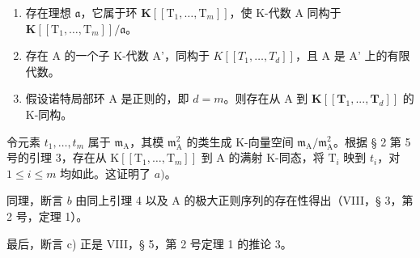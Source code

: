 \begin{enumerate}
\def\labelenumi{\alph{enumi})}
\item
  存在理想 \(\mathfrak{a}\)，它属于环 \(\mathbf{K}[[\mathrm{T}_1,\dots,\mathrm{T}_m]]\)，使 K-代数 A 同构于 \(\mathbf{K}[[\mathrm{T}_1,\dots,\mathrm{T}_m]] / \mathfrak{a}\)。
\item
  存在 A 的一个子 K-代数 A'，同构于 \(K[[T_{1}, \ldots, T_{d}]]\)，且 A 是 A' 上的有限代数。
\item
  假设诺特局部环 A 是正则的，即 \(d = m\)。则存在从 A 到 \(\mathbf{K}[[\mathbf{T}_1, ..., \mathbf{T}_d]]\) 的 K-同构。
\end{enumerate}

令元素 \(t_{1},\ldots,t_{m}\) 属于 \(\mathfrak{m}_{\mathrm{A}}\)，其模 \(\mathfrak{m}_{\mathrm{A}}^{2}\) 的类生成 K-向量空间 \(\mathfrak{m}_{\mathrm{A}}/\mathfrak{m}_{\mathrm{A}}^{2}\)。根据 § 2 第 5 号的引理 3，存在从 \(\mathrm{K}[[\mathrm{T}_{1},\ldots,\mathrm{T}_{m}]]\) 到 A 的满射 K-同态，将 \(\mathrm{T}_{i}\) 映到 \(t_{i}\)，对 \(1\leqslant i\leqslant m\) 均如此。这证明了 \(a)\)。

同理，断言 \(b\) 由同上引理 4 以及 A 的极大正则序列的存在性得出（VIII，§ 3，第 2 号，定理 1）。

最后，断言 c) 正是 VIII，§ 5，第 2 号定理 1 的推论 3。

